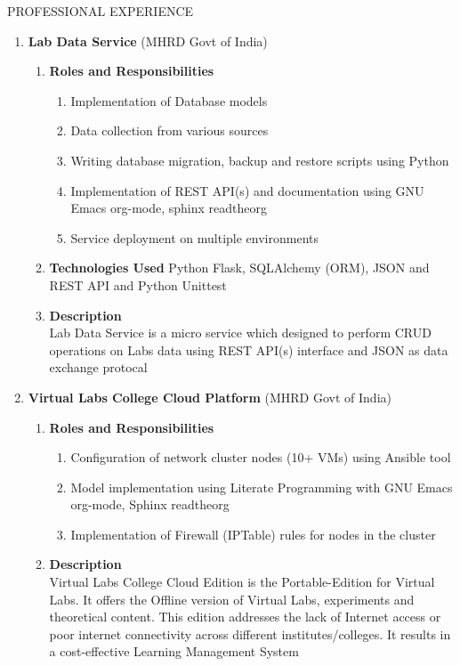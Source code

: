 \documentclass{resume} %
\newcommand{\blank}[1]{\hspace*{#1}}
\begin{document}
\begin{rSection}{PROFESSIONAL EXPERIENCE}
\begin{rSubsection}
\begin{enumerate}[label=\bfseries\arabic*]
\item \textbf {Lab Data Service} (MHRD Govt of India)
  \begin{enumerate}
  \item \textbf{Roles and Responsibilities }
    \begin{enumerate}
    \item Implementation of Database models
    \item Data collection from various sources
    \item Writing database migration, backup and restore scripts using
      Python
    \item Implementation of REST API(s) and documentation
      using GNU Emacs org-mode, sphinx readtheorg
    \item Service deployment on multiple environments
    \end{enumerate}
  \item \textbf{Technologies Used } Python Flask, SQLAlchemy
    (ORM), JSON and REST API and Python Unittest
  \item \textbf{Description } \\ \blank{2 cm} Lab Data
    Service is a micro service which designed to perform
    CRUD operations on Labs data using REST API(s) interface
    and JSON as data exchange protocal
  \end{enumerate}

\item \textbf {Virtual Labs College Cloud Platform} (MHRD Govt of India)
  \begin{enumerate}
    
  \item \textbf{Roles and Responsibilities }
    \begin{enumerate}
    \item Configuration of network cluster nodes (10+
      VMs) using Ansible tool
    \item Model implementation using Literate Programming with GNU Emacs
      org-mode, Sphinx readtheorg
    \item Implementation of Firewall (IPTable) rules for nodes in the
      cluster
    \end{enumerate}
    
  \item \textbf{Description } \\ \blank{2 cm} Virtual Labs College
    Cloud Edition is the Portable-Edition for Virtual Labs. It offers
    the Offline version of Virtual Labs, experiments and theoretical
    content. This edition addresses the lack of Internet access or
    poor internet connectivity across different
    institutes/colleges. It results in a cost-effective Learning
    Management System
    

\end{enumerate}
\end{enumerate}
\end{rSubsection}
\end{rSection}
\end{document}
